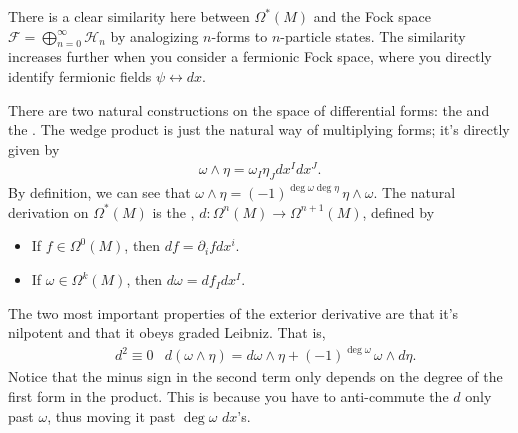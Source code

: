 \documentclass[11pt]{article}
\begin{document}
\begin{reemark}
    There is a clear similarity here between $\Omega^*(M)$ and the Fock 
    space $\mathcal{F} = \bigoplus_{n = 0}^{\infty} \mathcal{H}_n$
    by analogizing $n$-forms to $n$-particle states. The similarity increases
    further when you consider a fermionic Fock space, where you directly
    identify fermionic fields $\psi \leftrightarrow dx$.
\end{reemark}

There are two natural constructions on the space of differential forms: the 
 and the . The wedge product is 
just the natural way of multiplying forms; it's directly given by
\begin{align*}
    \omega \wedge \eta = \omega_I \eta_J dx^I dx^J.
\end{align*}
By definition, we can see that $\omega \wedge \eta = (-1)^{\deg{\omega} \deg{\eta}} \, \eta \wedge \omega$.
The natural derivation on $\Omega^*(M)$ is the ,
$d \colon \Omega^n(M) \to \Omega^{n+1}(M)$, defined by
\begin{itemize}
    \item If $f \in \Omega^0(M)$, then $df = \partial_i f dx^i$.
    \item If $\omega \in \Omega^k(M)$, then $d\omega = df_I dx^I$.
\end{itemize}

The two most important properties of the exterior derivative are
that it's nilpotent and that it obeys graded Leibniz. That is,
\begin{align*}
    & d^2 \equiv 0 
    & d(\omega \wedge \eta) = d\omega \wedge \eta + (-1)^{\deg{\omega}} \, \omega \wedge d\eta.
\end{align*}
Notice that the minus sign in the second term only depends on the degree
of the first form in the product. This is because you have to anti-commute
the $d$ only past $\omega$, thus moving it past $\deg{\omega}$ $dx$'s.
\end{document}
